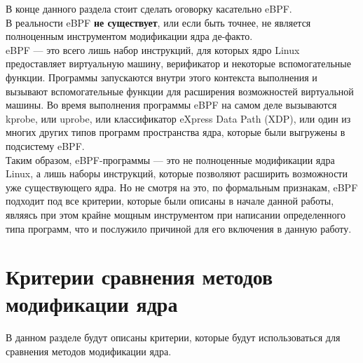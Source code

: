 В конце данного раздела стоит сделать оговорку касательно eBPF\@.
\vspace{5mm}\\
В реальности eBPF \textbf{не существует}, или если быть точнее, не является полноценным инструментом модификации ядра де-факто.
\vspace{5mm}\\
eBPF — это всего лишь набор инструкций, для которых ядро Linux предоставляет виртуальную машину, верификатор и некоторые вспомогательные функции.
Программы запускаются внутри этого контекста выполнения и вызывают вспомогательные функции для расширения возможностей виртуальной машины.
Во время выполнения программы eBPF на самом деле вызываются kprobe, или uprobe, или классификатор eXpress Data Path (XDP),
или один из многих других типов программ пространства ядра, которые были выгружены в подсистему eBPF\@.
\\
Таким образом, eBPF-программы — это не полноценные модификации ядра Linux, а лишь наборы инструкций, которые позволяют расширить возможности уже существующего ядра\@.
Но не смотря на это, по формальным признакам, eBPF подходит под все критерии, которые были описаны в начале данной работы,
являясь при этом крайне мощным инструментом при написании определенного типа программ, что и послужило причиной для его включения в данную работу.
\section{Критерии сравнения методов модификации ядра}\label{sec:----}
В данном разделе будут описаны критерии, которые будут использоваться для сравнения методов модификации ядра.

